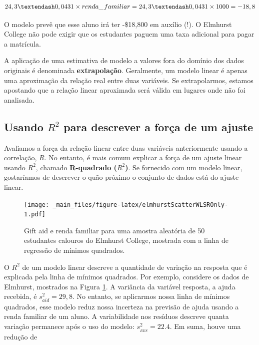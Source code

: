 \documentclass[
]{book}
\theoremstyle{definition}
\theoremstyle{definition}
\theoremstyle{definition}
\theoremstyle{definition}
\theoremstyle{remark}
\begin{document}
\begin{align*}
24,3 – 0,0431\times renda\_\hspace{0.3mm}familiar  = 24,3 – 0,0431\times 1000 = -18,8
\end{align*}

O modelo prevê que esse aluno irá ter -\$18,800 em auxílio (!). O Elmhurst College não pode exigir que os estudantes paguem uma taxa adicional para pagar a matrícula.

A aplicação de uma estimativa de modelo a valores fora do domínio dos dados originais é denominada \textbf{extrapolação}. Geralmente, um modelo linear é apenas uma aproximação da relação real entre duas variáveis. Se extrapolarmos, estamos apostando que a relação linear aproximada será válida em lugares onde não foi analisada.

\hypertarget{usingR2DescribeStrengthAdjustment}{%
\subsection{\texorpdfstring{Usando \(R^2\) para descrever a força de um ajuste}{Usando R\^{}2 para descrever a força de um ajuste}}\label{usingR2DescribeStrengthAdjustment}}

Avaliamos a força da relação linear entre duas variáveis anteriormente usando a correlação, \(R\). No entanto, é mais comum explicar a força de um ajuste linear usando \(R^2\), chamado \textbf{R-quadrado (\(R^2\))}. Se fornecido com um modelo linear, gostaríamos de descrever o quão próximo o conjunto de dados está do ajuste linear.

\begin{figure}
\centering
\texttt{[image: \_main\_files/figure-latex/elmhurstScatterWLSROnly-1.pdf]}
\caption{\label{fig:elmhurstScatterWLSROnly}Gift aid e renda familiar para uma amostra aleatória de 50 estudantes calouros do Elmhurst College, mostrada com a linha de regressão de mínimos quadrados.}
\end{figure}

O \(R^2\) de um modelo linear descreve a quantidade de variação na resposta que é explicada pela linha de mínimos quadrados. Por exemplo, considere os dados de Elmhurst, mostrados na Figura \ref{fig:elmhurstScatterWLSROnly}. A variância da variável resposta, a ajuda recebida, é \(s_{aid}^2=29,8\). No entanto, se aplicarmos nossa linha de mínimos quadrados, esse modelo reduz nossa incerteza na previsão de ajuda usando a renda familiar de um aluno. A variabilidade nos resíduos descreve quanta variação permanece após o uso do modelo: \(s_{_{RES}}^2 = 22.4\). Em suma, houve uma redução de
\end{document}
